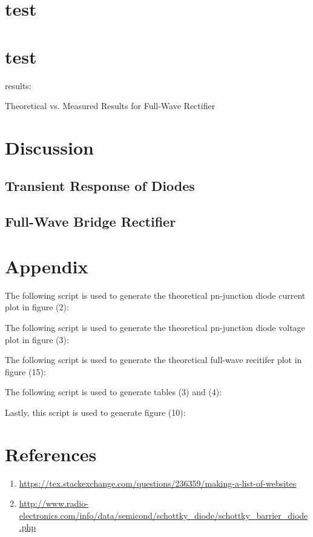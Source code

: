 \documentclass{article}
\begin{document}
\section{test}
\section{test}
\newpage
results: \\

\FloatBarrier

\begin{table}[h!]
	\centering
	\caption{Theoretical vs. Measured Results for Full-Wave Rectifier}
	\label{tab:theory_vs_practice}
\end{table}

\FloatBarrier

\section{Discussion}
\subsection{Transient Response of Diodes}

\subsection{Full-Wave Bridge Rectifier}

\section{Appendix}
The following script is used to generate the theoretical pn-junction diode current plot in figure (2):

The following script is used to generate the theoretical pn-junction diode voltage plot in figure (3):

The following script is used to generate the theoretical full-wave recitifer plot in figure (15):

The following script is used to generate tables (3) and (4):

Lastly, this script is used to generate figure (10):

\section{References}
\begin{enumerate}
	\item \label{ref:schottky} \url{https://tex.stackexchange.com/questions/236359/making-a-list-of-websites}
	\item \label{ref:schottky2} \url{http://www.radio-electronics.com/info/data/semicond/schottky_diode/schottky_barrier_diode.php}
\end{enumerate}
\end{document}
